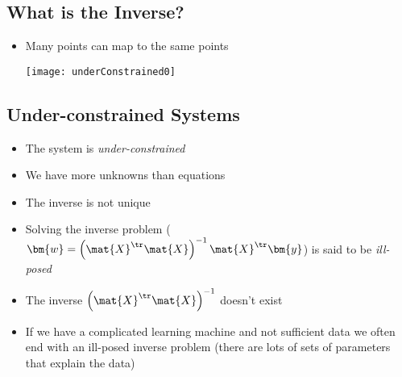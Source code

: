 \begin{slide}
\section[-2]{What is the Inverse?}

\pb
  \begin{itemize}
  \item Many points can map to the same points\pause
    \begin{center}
      \texttt{[image: underConstrained0]}
    \end{center}
  \end{itemize}

\end{slide}


\begin{slide}
\section[-1]{Under-constrained Systems}

\begin{PauseHighLight}
  \begin{itemize}
  \item The system is \emph{under-constrained}\pause
  \item We have more unknowns than equations\pause
  \item The inverse is not unique\pause
  \item Solving the inverse problem ($\bm{w} =
    \left(\mat{X}^\tr\mat{X}\right)^{-1} \mat{X}^\tr \bm{y}$) is said 
    to be \emph{ill-posed}\pause
  \item The inverse $\left(\mat{X}^\tr\mat{X}\right)^{-1}$ doesn't
    exist\pause 
  \item If we have a complicated learning machine and not sufficient
    data we often end with an ill-posed inverse problem (there are lots
    of sets of parameters that explain the data)\pause
  \end{itemize}
\end{PauseHighLight}

\end{slide}



